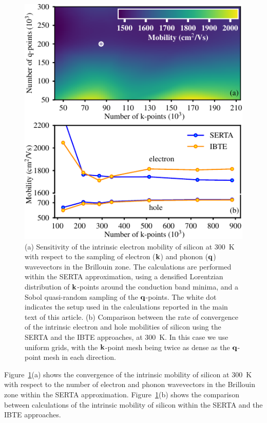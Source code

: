 \documentclass[aps,prl,twocolumn,superscriptaddress]{revtex4-1}
\begin{document}
\begin{figure}
  \centering
  \includegraphics[width=\columnwidth]{figS1.pdf}  
  \caption{\label{fig1}
  (a) Sensitivity of the intrinsic electron mobility of silicon at 300~K with respect to the sampling 
  of electron (${\bf k}$) and phonon (${\bf q}$) wavevectors in the Brillouin zone. The calculations are
  performed within the SERTA approximation, using a densified Lorentzian distribution of ${\bf k}$-points around 
  the conduction band minima, and a Sobol quasi-random sampling of the ${\bf q}$-points. The white dot
  indicates the setup used in the calculations reported in the main text of this article.
  (b) Comparison between the rate of convergence of the intrinsic electron and hole mobilities of silicon 
  using the SERTA and the IBTE approaches, at 300~K. In this case we use uniform grids, with the ${\bf k}$-point
  mesh being twice as dense as the ${\bf q}$-point mesh in each direction.
  }
\end{figure}

Figure~\ref{fig1}(a) shows the convergence of the intrinsic mobility of silicon at 300~K with respect to
the number of electron and phonon wavevectors in the Brillouin zone within the SERTA approximation. 
Figure~\ref{fig1}(b) shows the comparison between calculations of the intrinsic mobility of silicon within the SERTA and the IBTE approaches.
\end{document}
